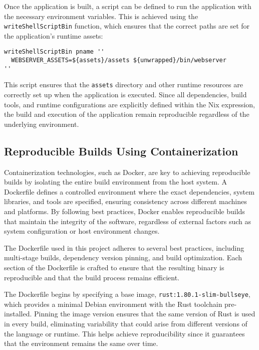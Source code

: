 Once the application is built, a script can be defined to run the application
with the necessary environment variables. This is achieved using the
\texttt{writeShellScriptBin} function, which ensures that the correct paths
are set for the application’s runtime assets:

\begin{lstlisting}[caption={Generating the run script in Nix}]
writeShellScriptBin pname ''
  WEBSERVER_ASSETS=${assets}/assets ${unwrapped}/bin/webserver
''
\end{lstlisting}

This script ensures that the \texttt{assets} directory and other runtime resources
are correctly set up when the application is executed. Since all dependencies,
build tools, and runtime configurations are explicitly defined within the Nix
expression, the build and execution of the application remain reproducible
regardless of the underlying environment.

\subsection{Reproducible Builds Using Containerization}

Containerization technologies, such as Docker, are key to achieving reproducible builds
by isolating the entire build environment from the host system. A Dockerfile defines
a controlled environment where the exact dependencies, system libraries, and tools
are specified, ensuring consistency across different machines and platforms. By
following best practices, Docker enables reproducible builds that maintain the integrity
of the software, regardless of external factors such as system configuration or host
environment changes.

The Dockerfile used in this project adheres to several best practices, including
multi-stage builds, dependency version pinning, and build optimization. Each section
of the Dockerfile is crafted to ensure that the resulting binary is reproducible and
that the build process remains efficient.

The Dockerfile begins by specifying a base image, \texttt{rust:1.80.1-slim-bullseye},
which provides a minimal Debian environment with the Rust toolchain pre-installed.
Pinning the image version ensures that the same version of Rust is used in every build,
eliminating variability that could arise from different versions of the language or
runtime. This helps achieve reproducibility since it guarantees that the environment
remains the same over time.

